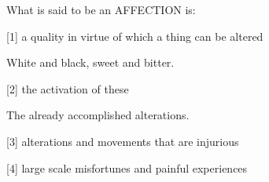 
What is said to be an AFFECTION is:

[1]     a quality in virtue of which a thing can be altered
    
        White and black, sweet and bitter.
    
[2]     the activation of these

        The already accomplished alterations.

[3]     alterations and movements that are injurious

[4]     large scale misfortunes and painful experiences
